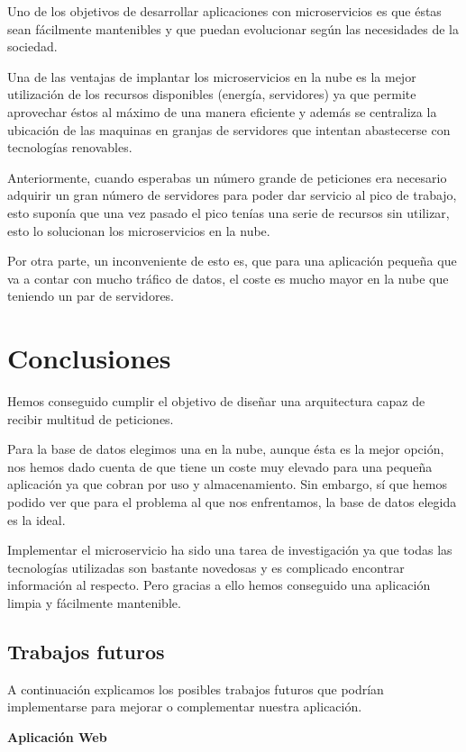 \documentclass[12pt]{report} %
\begin{document}
Uno de los objetivos de desarrollar aplicaciones con microservicios es que éstas sean fácilmente mantenibles y que puedan evolucionar según las necesidades de la sociedad.

Una de las ventajas de implantar los microservicios en la nube es la mejor utilización de los recursos disponibles (energía, servidores) ya que permite aprovechar éstos al máximo de una manera eficiente y además se centraliza la ubicación de las maquinas en granjas de servidores que intentan abastecerse con tecnologías renovables.

Anteriormente, cuando esperabas un número grande de peticiones era necesario adquirir un gran número de servidores para poder dar servicio al pico de trabajo, esto suponía que una vez pasado el pico tenías una serie de recursos sin utilizar, esto lo solucionan los microservicios en la nube.

Por otra parte, un inconveniente de esto es, que para una aplicación pequeña que va a contar con mucho tráfico de datos, el coste es mucho mayor en la nube que teniendo un par de servidores.

\chapter{Conclusiones}

Hemos conseguido cumplir el objetivo de diseñar una arquitectura capaz de recibir multitud de peticiones.

Para la base de datos elegimos una en la nube, aunque ésta es la mejor opción, nos hemos dado cuenta de que tiene un coste muy elevado para una pequeña aplicación ya que cobran por uso y almacenamiento. Sin embargo, sí que hemos podido ver que para el problema al que nos enfrentamos, la base de datos elegida es la ideal.

Implementar el microservicio ha sido una tarea de investigación ya que todas las tecnologías utilizadas son bastante novedosas y es complicado encontrar información al respecto. Pero gracias a ello hemos conseguido una aplicación limpia y fácilmente mantenible.

\section{Trabajos futuros}

A continuación explicamos los posibles trabajos futuros que podrían implementarse para mejorar o complementar nuestra aplicación.

\textbf{Aplicación Web}
\end{document}
